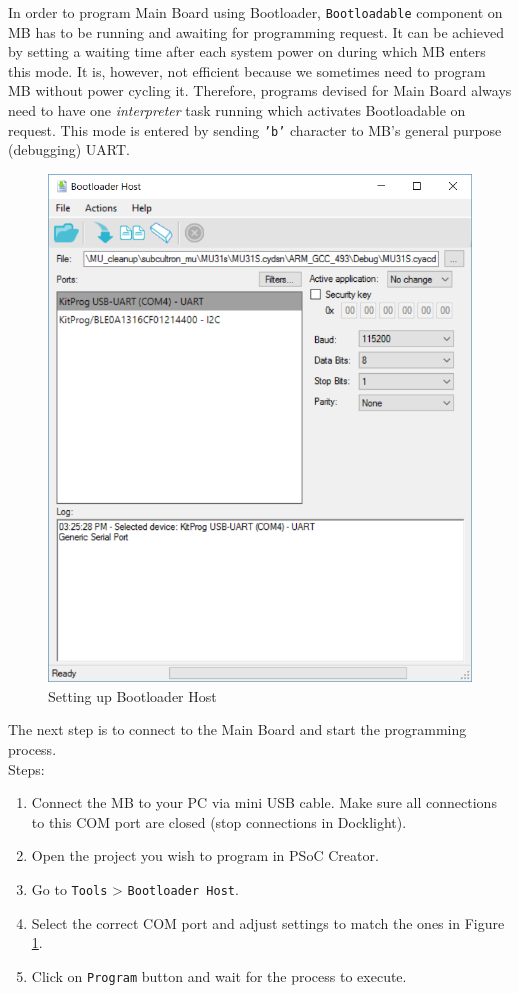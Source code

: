 In order to program Main Board using Bootloader, \texttt{Bootloadable} component on MB has to be running and awaiting for programming request. It can be achieved by setting a waiting time after each system power on during which MB enters this mode. It is, however, not efficient because we sometimes need to program MB without power cycling it. Therefore, programs devised for Main Board always need to have one \textit{interpreter} task running which activates Bootloadable on request. This mode is entered by sending \texttt{'b'} character to MB's general purpose (debugging) UART.

\begin{figure}[htb]
    \centering
	  \includegraphics[width=0.6\linewidth]{figures/Bootloader_BLE.png}
	\caption{Setting up Bootloader Host}
	\label{fig:bootloader_host}
\end{figure}

The next step is to connect to the Main Board and start the programming process.\\
Steps:
\begin{enumerate}
	\item Connect the MB to your PC via mini USB cable. Make sure all connections to this COM port are closed (stop connections in Docklight).
	\item Open the project you wish to program in PSoC Creator.
	\item Go to \texttt{Tools} > \texttt{Bootloader Host}.
	\item Select the correct COM port and adjust settings to match the ones in Figure \ref{fig:bootloader_host}.
	\item Click on \texttt{Program} button and wait for the process to execute.
\end{enumerate}

